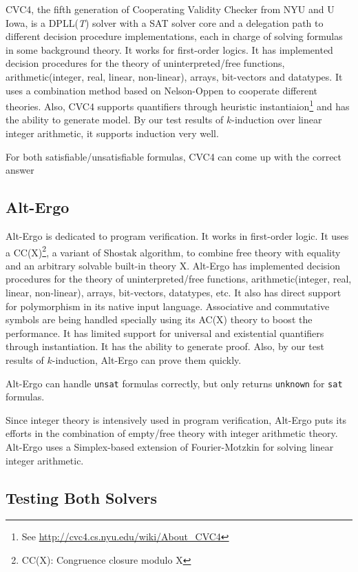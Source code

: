 \documentclass[10pt,letter]{article}
\theoremstyle{definition}
\begin{document}
CVC4, the fifth generation of Cooperating Validity Checker from NYU and U Iowa, is a DPLL({\it T}) solver with a SAT solver core and a delegation path to different decision procedure implementations, each in charge of solving formulas in some background theory\cite{barrett:cvc4:2011}. It works for first-order logics. It has implemented decision procedures for the theory of uninterpreted/free functions, arithmetic(integer, real, linear, non-linear), arrays, bit-vectors and datatypes. It uses a combination method based on Nelson-Oppen to cooperate different theories. Also, CVC4 supports quantifiers through heuristic instantiaion\footnote{See \url{http://cvc4.cs.nyu.edu/wiki/About_CVC4}} and has the ability to generate model. By our test results of $k$-induction over linear integer arithmetic, it supports induction very well.

For both satisfiable/unsatisfiable formulas, CVC4 can come up with the correct answer

\subsection{Alt-Ergo}

Alt-Ergo is dedicated to program verification. It works in first-order logic. It uses a CC(X)\footnote{CC(X): Congruence closure modulo X}, a variant of Shostak algorithm, to combine free theory with equality and an arbitrary solvable built-in theory X\cite{conchonHDR2012}. Alt-Ergo has implemented decision procedures for the theory of uninterpreted/free functions, arithmetic(integer, real, linear, non-linear), arrays, bit-vectors, datatypes, etc. It also has direct support for polymorphism in its native input language. Associative and commutative symbols are being handled specially using its AC(X) theory to boost the performance. It has limited support for universal and existential quantifiers through instantiation. It has the ability to generate proof. Also, by our test results of $k$-induction, Alt-Ergo can prove them quickly.

Alt-Ergo can handle {\tt unsat} formulas correctly, but only returns {\tt unknown} for {\tt sat} formulas.

Since integer theory is intensively used in program verification, Alt-Ergo puts its efforts in the combination of empty/free theory with integer arithmetic theory. Alt-Ergo uses a Simplex-based extension of Fourier-Motzkin for solving linear integer arithmetic\cite{bobot:hal-00687640}.

\subsection{Testing Both Solvers}
\end{document}
